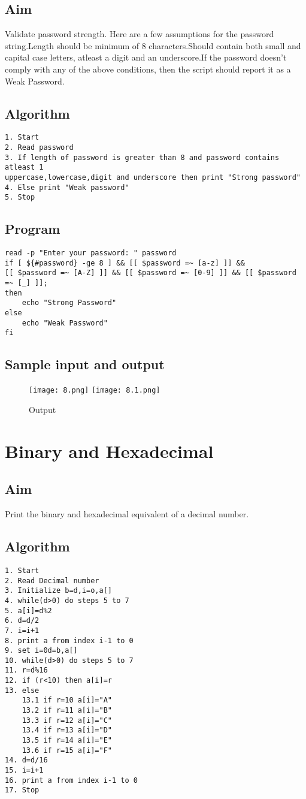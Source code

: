 \documentclass{article}
\begin{document}
\subsection{Aim}
Validate password strength. Here are a few assumptions for the password string.Length should
be minimum of 8 characters.Should contain both small and capital case letters, atleast a digit
and an underscore.If the password doesn’t comply with any of the above conditions, then the
script should report it as a Weak Password.
\subsection{Algorithm}
\begin{Verbatim}[tabsize = 4]
1. Start
2. Read password
3. If length of password is greater than 8 and password contains atleast 1
uppercase,lowercase,digit and underscore then print "Strong password"
4. Else print "Weak password"
5. Stop
\end{Verbatim}
\subsection{Program}
\begin{Verbatim}[tabsize = 4]
read -p "Enter your password: " password
if [ ${#password} -ge 8 ] && [[ $password =~ [a-z] ]] &&
[[ $password =~ [A-Z] ]] && [[ $password =~ [0-9] ]] && [[ $password =~ [_] ]];
then
    echo "Strong Password"
else
    echo "Weak Password"
fi
\end{Verbatim}
\thispagestyle{third}
\subsection{Sample input and output}
\begin{figure}[H]
    \centering
    \texttt{[image: 8.png]}
    \texttt{[image: 8.1.png]}
    \caption{Output}
    \label{fig:my_label2}
\end{figure}
\section{\Large Binary and Hexadecimal}
\subsection{Aim}
Print the binary and hexadecimal equivalent of a decimal number.
\subsection{Algorithm}
\begin{Verbatim}[tabsize = 4]
1. Start
2. Read Decimal number
3. Initialize b=d,i=o,a[]
4. while(d>0) do steps 5 to 7
5. a[i]=d%2
6. d=d/2
7. i=i+1
8. print a from index i-1 to 0
9. set i=0d=b,a[]
10. while(d>0) do steps 5 to 7
11. r=d%16
12. if (r<10) then a[i]=r
13. else 
    13.1 if r=10 a[i]="A"
    13.2 if r=11 a[i]="B"
    13.3 if r=12 a[i]="C"
    13.4 if r=13 a[i]="D"
    13.5 if r=14 a[i]="E"
    13.6 if r=15 a[i]="F"
14. d=d/16
15. i=i+1
16. print a from index i-1 to 0
17. Stop
\end{Verbatim}
\end{document}
